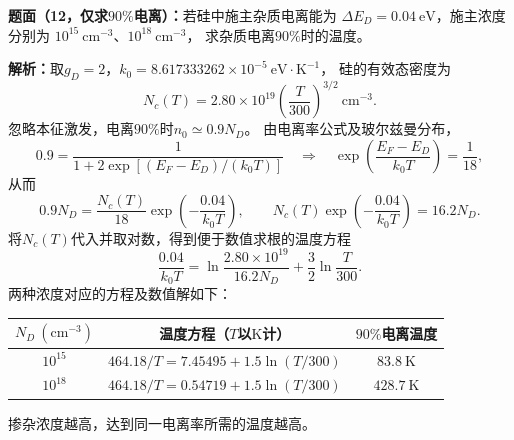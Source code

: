 \begin{problem}
    \textbf{题面（12，仅求$90\%$电离）：}若硅中施主杂质电离能为
    $\Delta E_D=0.04\ \mathrm{eV}$，施主浓度分别为
    $10^{15}\ \mathrm{cm}^{-3}$、$10^{18}\ \mathrm{cm}^{-3}$，
    求杂质电离$90\%$时的温度。

    \textbf{解析：}取$g_D=2$，$k_0=8.617333262\times10^{-5}\ \mathrm{eV\cdot K^{-1}}$，
    硅的有效态密度为
    \[
    N_c(T)=2.80\times10^{19}\left(\frac{T}{300}\right)^{3/2}\ \mathrm{cm}^{-3}.
    \]
    忽略本征激发，电离$90\%$时$n_0\simeq0.9N_D$。
    由电离率公式及玻尔兹曼分布，
    \[
    0.9=\frac{1}{1+2\exp[(E_F-E_D)/(k_0T)]}
    \quad\Longrightarrow\quad
    \exp\!\left(\frac{E_F-E_D}{k_0T}\right)=\frac{1}{18},
    \]
    从而
    \[
    0.9N_D=\frac{N_c(T)}{18}\exp\!\left(-\frac{0.04}{k_0T}\right),
    \qquad
    N_c(T)\exp\!\left(-\frac{0.04}{k_0T}\right)=16.2N_D.
    \]
    将$N_c(T)$代入并取对数，得到便于数值求根的温度方程
    \[
    \frac{0.04}{k_0T}
    =\ln\frac{2.80\times10^{19}}{16.2N_D}
    +\frac{3}{2}\ln\frac{T}{300}.
    \]
    两种浓度对应的方程及数值解如下：
    \begin{center}
        \begin{tabular}{c c c}
            \hline
            $N_D\ (\mathrm{cm}^{-3})$ & 温度方程（$T$以$\mathrm{K}$计） & $90\%$电离温度 \\
            \hline
            $10^{15}$ & $464.18/T=7.45495+1.5\ln(T/300)$ & $\boxed{83.8\ \mathrm{K}}$ \\
            $10^{18}$ & $464.18/T=0.54719+1.5\ln(T/300)$ & $\boxed{428.7\ \mathrm{K}}$ \\
            \hline
        \end{tabular}
    \end{center}
    掺杂浓度越高，达到同一电离率所需的温度越高。
\end{problem}

